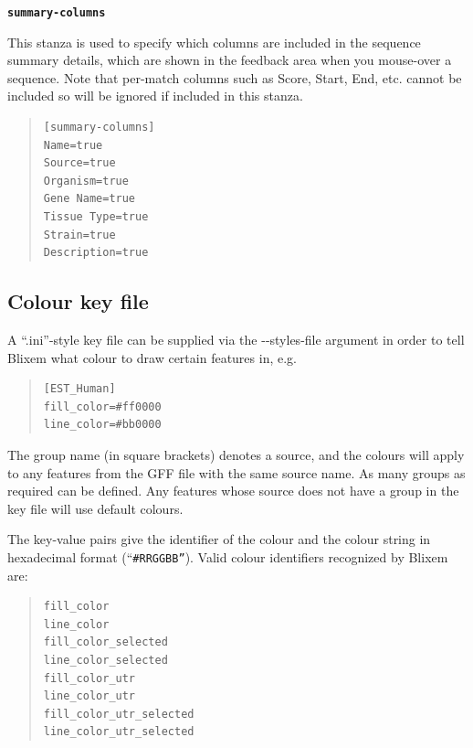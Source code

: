 \documentclass[letterpaper]{article}
\newcommand\textstyleSourceText[1]{\texttt{#1}}
\begin{document}
{\textstyleSourceText{\textrm{\textbf{summary-columns }}}}

This stanza is used to specify which columns are included in the sequence summary details, which are shown in the feedback area when you mouse-over a sequence.  Note that per-match columns such as Score, Start, End, etc. cannot be included so will be ignored if included in this stanza.

\begin{quote}
\begin{verbatim}
[summary-columns]
Name=true
Source=true
Organism=true
Gene Name=true
Tissue Type=true
Strain=true
Description=true
\end{verbatim}
\end{quote}

{\color[rgb]{0.30980393,0.5058824,0.7411765}\subsection[Colour key file ]{Colour key file }}
\hypertarget{RefHeading30392057371307}{}{
A {\textquotedblleft}.ini{\textquotedblright}-style key file can be
supplied via the -{}-styles-file argument in order to tell Blixem what
colour to draw certain features in, e.g.}

\bigskip

\begin{quote}
\begin{verbatim}
[EST_Human]
fill_color=#ff0000
line_color=#bb0000
\end{verbatim}
\end{quote}

{The group name (in square brackets) denotes a source, and the colours
will apply to any features from the GFF file with the same source name.
As many groups as required can be defined. Any features whose
source does not have a group in the key file will use default colours.}

\bigskip

{The key-value pairs give the identifier of the colour and the colour
string in hexadecimal format
({\textquotedblleft}\texttt{\#RRGGBB{\textquotedblright}}). Valid colour
identifiers recognized by Blixem are:}

\begin{quote}
\begin{verbatim}
fill_color
line_color
fill_color_selected
line_color_selected
fill_color_utr
line_color_utr
fill_color_utr_selected
line_color_utr_selected
\end{verbatim}
\end{quote}
\end{document}
